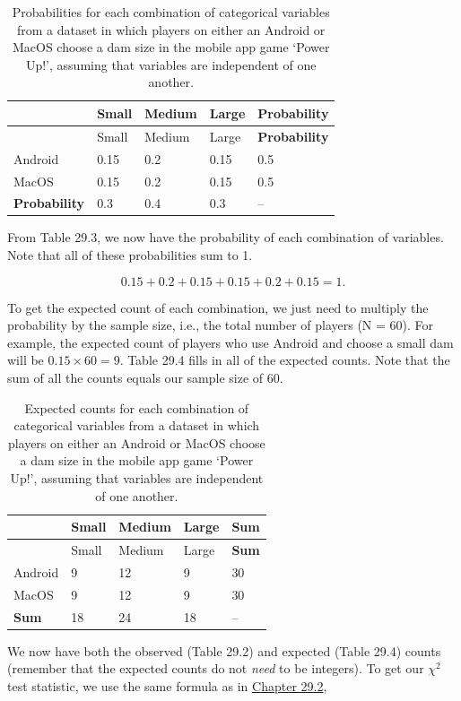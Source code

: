 \documentclass[
  openany]{scrbook}
\begin{document}
\begin{longtable}[]{@{}lllll@{}}
\caption{\label{tab:unnamed-chunk-122}Probabilities for each combination of categorical variables from a dataset in which players on either an Android or MacOS choose a dam size in the mobile app game `Power Up!', assuming that variables are independent of one another.}\tabularnewline
\toprule
& Small & Medium & Large & \textbf{Probability} \\
\midrule
\endfirsthead
\toprule
& Small & Medium & Large & \textbf{Probability} \\
\midrule
\endhead
Android & 0.15 & 0.2 & 0.15 & 0.5 \\
MacOS & 0.15 & 0.2 & 0.15 & 0.5 \\
\textbf{Probability} & 0.3 & 0.4 & 0.3 & -- \\
\bottomrule
\end{longtable}

From Table 29.3, we now have the probability of each combination of variables.
Note that all of these probabilities sum to 1.

\[0.15 + 0.2 + 0.15 + 0.15 + 0.2 + 0.15 = 1.\]

To get the expected count of each combination, we just need to multiply the probability by the sample size, i.e., the total number of players (N = 60).
For example, the expected count of players who use Android and choose a small dam will be \(0.15 \times 60 = 9\).
Table 29.4 fills in all of the expected counts.
Note that the sum of all the counts equals our sample size of 60.

\begin{longtable}[]{@{}lllll@{}}
\caption{\label{tab:unnamed-chunk-123}Expected counts for each combination of categorical variables from a dataset in which players on either an Android or MacOS choose a dam size in the mobile app game `Power Up!', assuming that variables are independent of one another.}\tabularnewline
\toprule
& Small & Medium & Large & \textbf{Sum} \\
\midrule
\endfirsthead
\toprule
& Small & Medium & Large & \textbf{Sum} \\
\midrule
\endhead
Android & 9 & 12 & 9 & 30 \\
MacOS & 9 & 12 & 9 & 30 \\
\textbf{Sum} & 18 & 24 & 18 & -- \\
\bottomrule
\end{longtable}

We now have both the observed (Table 29.2) and expected (Table 29.4) counts (remember that the expected counts do not \emph{need} to be integers).
To get our \(\chi^{2}\) test statistic, we use the same formula as in \protect\hyperlink{chi-squared-goodness-of-fit}{Chapter 29.2},
\end{document}
